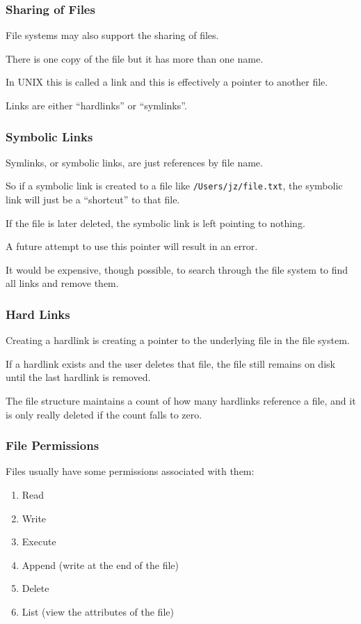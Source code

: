 \begin{frame}
	\frametitle{Sharing of Files}

	File systems may also support the sharing of files.

	There is one copy of the file but it has more than one name.

	In UNIX this is called a \alert{link} and this is effectively a pointer to another file.

	Links are either ``hardlinks'' or ``symlinks''.

\end{frame}

\begin{frame}
	\frametitle{Symbolic Links}

	Symlinks, or symbolic links, are just references by file name.

	So if a symbolic link is created to a file like \texttt{/Users/jz/file.txt}, the symbolic link will just be a ``shortcut'' to that file.

	If the file is later deleted, the symbolic link is left pointing to nothing.

	A future attempt to use this pointer will result in an error.

	It would be expensive, though possible, to search through the file system to find all links and remove them.


\end{frame}

\begin{frame}
	\frametitle{Hard Links}

	Creating a hardlink is creating a pointer to the underlying file in the file system.

	If a hardlink exists and the user deletes that file, the file still remains on disk until the last hardlink is removed.

	The file structure maintains a count of how many hardlinks reference a file, and it is only really deleted if the count falls to zero.


\end{frame}



\begin{frame}
	\frametitle{File Permissions}

	Files usually have some permissions associated with them:

	\begin{enumerate}
		\item Read
		\item Write
		\item Execute
		\item Append (write at the end of the file)
		\item Delete
		\item List (view the attributes of the file)
	\end{enumerate}

\end{frame}

